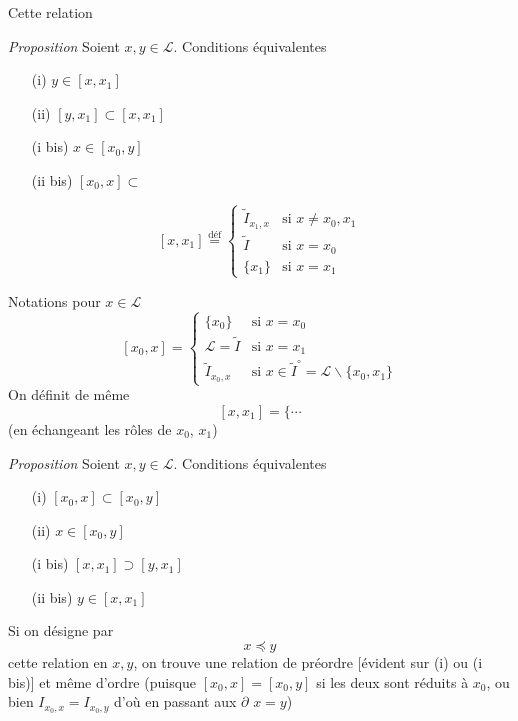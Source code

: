 \documentclass[11pt,a4paper]{article}
\begin{document}
 Cette relation 

\emph{Proposition} Soient $x, y \in \mathcal{L}$. Conditions équivalentes
\begin{itemize}
  \item[(i)] $y \in [x,x_1]$
  \item[(ii)] $[y,x_1] \subset [x,x_1]$
  \item[(i bis)] $x \in [x_0,y]$
  \item[(ii bis)] $[x_0,x] \subset$
\end{itemize}
\[
  [x,x_1] \overset{\text{déf}}{=}
  \left\lbrace
  \begin{array}{ll}
    \widetilde{I}_{x_1,x} & \text{si } x \neq x_0, x_1 \\
    \widetilde{I} & \text{si } x = x_0 \\
    \{x_1\} & \text{si } x = x_1
  \end{array}
  \right.
\]

\struck{\ill{}} Notations pour $x \in \mathcal{L}$
\[
  [x_0,x] = \left\lbrace
  \begin{array}{ll}
    \{x_0\} & \text{si } x = x_0 \\
    \mathcal{L} = \widetilde{I} & \text{si } x = x_1 \\
    \widetilde{I}_{x_0,x} & \text{si } x \in \widetilde{I}^{\circ} = \mathcal{L} \smallsetminus \{x_0,x_1\}
  \end{array}
  \right.
\]
On définit de même
\[
  [x,x_1] = \lbrace \cdots
\]
(en échangeant les rôles de $x_0$, $x_1$)

\emph{Proposition} Soient $x, y \in \mathcal{L}$. Conditions équivalentes
\begin{itemize}
  \item[(i)] $[x_0,x] \subset [x_0,y]$
  \item[(ii)] \struck{\ill{}} $x \in [x_0,y]$
  \item[(i bis)] $[x,x_1] \supset [y,x_1]$
  \item[(ii bis)] \struck{\ill{}} $y \in [x,x_1]$
\end{itemize}
Si on \struck{\ill{}} désigne par
\[
  x \preccurlyeq y
\]
cette relation en $x, y$, on trouve une relation de préordre [évident sur (i) ou (i bis)] et même d'ordre (puisque $[x_0,x] = [x_0,y]$   si les deux \struck{\ill{}} sont réduits à $x_0$, ou bien $I_{x_0,x} = I_{x_0,y}$ d'où en passant aux $\partial$ $x = y$)
\end{document}

